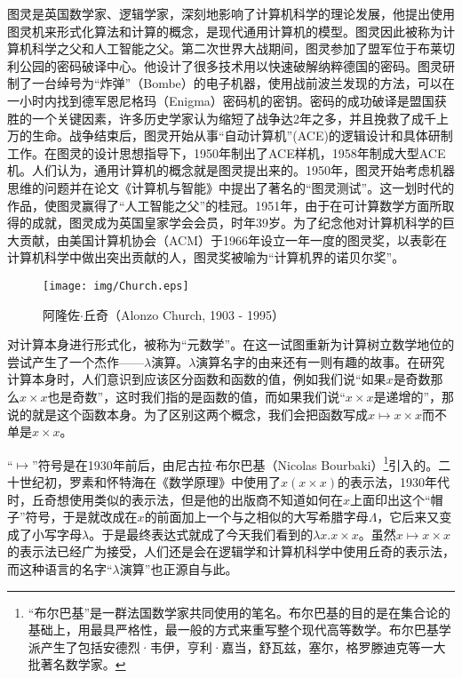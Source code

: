 \documentclass[UTF8]{article}
\begin{document}
图灵是英国数学家、逻辑学家，深刻地影响了计算机科学的理论发展，他提出使用图灵机来形式化算法和计算的概念，是现代通用计算机的模型。图灵因此被称为计算机科学之父和人工智能之父\cite{wiki-Turing}。第二次世界大战期间，图灵参加了盟军位于布莱切利公园的密码破译中心。他设计了很多技术用以快速破解纳粹德国的密码。图灵研制了一台绰号为“炸弹”（Bombe）的电子机器，使用战前波兰发现的方法，可以在一小时内找到德军恩尼格玛（Enigma）密码机的密钥。密码的成功破译是盟国获胜的一个关键因素，许多历史学家认为缩短了战争达2年之多，并且挽救了成千上万的生命。战争结束后，图灵开始从事“自动计算机”(ACE)的逻辑设计和具体研制工作。在图灵的设计思想指导下，1950年制出了ACE样机，1958年制成大型ACE机。人们认为，通用计算机的概念就是图灵提出来的。1950年，图灵开始考虑机器思维的问题并在论文《计算机与智能》中提出了著名的“图灵测试”。这一划时代的作品，使图灵赢得了“人工智能之父”的桂冠。1951年，由于在可计算数学方面所取得的成就，图灵成为英国皇家学会会员，时年39岁。为了纪念他对计算机科学的巨大贡献，由美国计算机协会（ACM）于1966年设立一年一度的图灵奖，以表彰在计算机科学中做出突出贡献的人，图灵奖被喻为“计算机界的诺贝尔奖”。

\begin{wrapfigure}{R}{0.3\textwidth}
 \centering
 \texttt{[image: img/Church.eps]}
 \captionsetup{labelformat=empty}
 \caption{阿隆佐$\cdot$丘奇（Alonzo Church, 1903 - 1995）}
 \label{fig:Church}
\end{wrapfigure}

对计算本身进行形式化，被称为“元数学”。在这一试图重新为计算树立数学地位的尝试产生了一个杰作——$\lambda$演算。$\lambda$演算名字的由来还有一则有趣的故事。在研究计算本身时，人们意识到应该区分函数和函数的值，例如我们说“如果$x$是奇数那么$x \times x$也是奇数”，这时我们指的是函数的值，而如果我们说“$x \times x$是递增的”，那说的就是这个函数本身。为了区别这两个概念，我们会把函数写成$x \mapsto x \times x$而不单是$x \times x$。

“$\mapsto$”符号是在1930年前后，由尼古拉$\cdot$布尔巴基（Nicolas Bourbaki）\footnote{“布尔巴基”是一群法国数学家共同使用的笔名。布尔巴基的目的是在集合论的基础上，用最具严格性，最一般的方式来重写整个现代高等数学。布尔巴基学派产生了包括安德烈·韦伊，亨利·嘉当，舒瓦兹，塞尔，格罗滕迪克等一大批著名数学家。}引入的。二十世纪初，罗素和怀特海在《数学原理》中使用了$\hat{x}(x \times x)$的表示法，1930年代时，丘奇想使用类似的表示法，但是他的出版商不知道如何在$x$上面印出这个“帽子”符号，于是就改成在$x$的前面加上一个与之相似的大写希腊字母$\Lambda$，它后来又变成了小写字母$\lambda$。于是最终表达式就成了今天我们看到的$\lambda x . x \times x$\cite{Dowek2011}。虽然$x \mapsto x \times x$的表示法已经广为接受，人们还是会在逻辑学和计算机科学中使用丘奇的表示法，而这种语言的名字“$\lambda$演算”也正源自与此。
\end{document}
